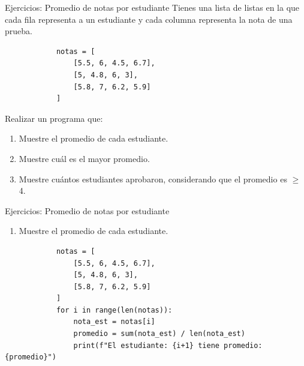 \documentclass{beamer}
\begin{document}
    \begin{frame}[fragile, t]{Ejercicios: Promedio de notas por estudiante}
        Tienes una lista de listas en la que cada fila representa a un estudiante y cada columna representa la nota de una prueba.
        \begin{verbatim}
            notas = [
                [5.5, 6, 4.5, 6.7], 
                [5, 4.8, 6, 3],
                [5.8, 7, 6.2, 5.9]
            ]
        \end{verbatim}
        
        Realizar un programa que:
        \begin{enumerate}
            \item Muestre el promedio de cada estudiante.
            \item Muestre cuál es el mayor promedio.
            \item Muestre cuántos estudiantes aprobaron, considerando que el promedio es $\geq$ 4.
        \end{enumerate}
    \end{frame}

    \begin{frame}[fragile, t]{Ejercicios: Promedio de notas por estudiante}
        \begin{enumerate}
            \item Muestre el promedio de cada estudiante.
        \end{enumerate}
        \begin{verbatim}
            notas = [
                [5.5, 6, 4.5, 6.7], 
                [5, 4.8, 6, 3],
                [5.8, 7, 6.2, 5.9]
            ]
            for i in range(len(notas)):
                nota_est = notas[i]
                promedio = sum(nota_est) / len(nota_est)
                print(f"El estudiante: {i+1} tiene promedio: {promedio}")
        \end{verbatim}
    \end{frame}
\end{document}
